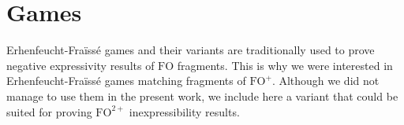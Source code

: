 \documentclass[a4paper,UKenglish,cleveref, autoref, thm-restate]{lipics-v2021}
\newcommand{\FO}{\mathrm{FO}}
\newcommand{\FOp}{\FO^+}
\newcommand{\FOtwp}{\FO^{2+}}
\begin{document}
    












































\section{Games} \label{ap:games}


Erhenfeucht-Fraïssé games and their variants are traditionally used to prove negative expressivity results of $\FO$ fragments. This is why we were interested in Erhenfeucht-Fraïssé games matching fragments of $\FOp$.
Although we did not manage to use them in the present work, we include here a variant that could be suited for proving $\FOtwp$ inexpressibility results.
\end{document}
